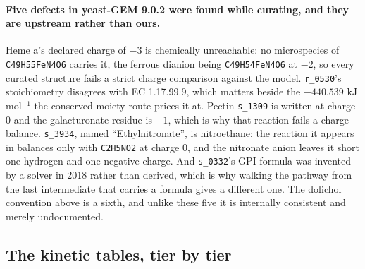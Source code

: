 \paragraph{Five defects in yeast-GEM 9.0.2 were found while curating, and they are upstream
rather than ours.} Heme a's declared charge of $-3$ is chemically unreachable: no
microspecies of \texttt{C49H55FeN4O6} carries it, the ferrous dianion being
\texttt{C49H54FeN4O6} at $-2$, so every curated structure fails a strict charge comparison
against the model. \texttt{r\_0530}'s stoichiometry disagrees with EC 1.17.99.9, which
matters beside the $-440.539$ kJ\,mol$^{-1}$ the conserved-moiety route prices it at. Pectin
\texttt{s\_1309} is written at charge 0 and the galacturonate residue is $-1$, which is why
that reaction fails a charge balance. \texttt{s\_3934}, named ``Ethylnitronate'', is
nitroethane: the reaction it appears in balances only with \texttt{C2H5NO2} at charge 0, and
the nitronate anion leaves it short one hydrogen and one negative charge. And
\texttt{s\_0332}'s GPI formula was invented by a solver in 2018 rather than derived, which
is why walking the pathway from the last intermediate that carries a formula gives a
different one. The dolichol convention above is a sixth, and unlike these five it is
internally consistent and merely undocumented.

\subsection{The kinetic tables, tier by tier}
\label{sec:kinetic-tiers}



